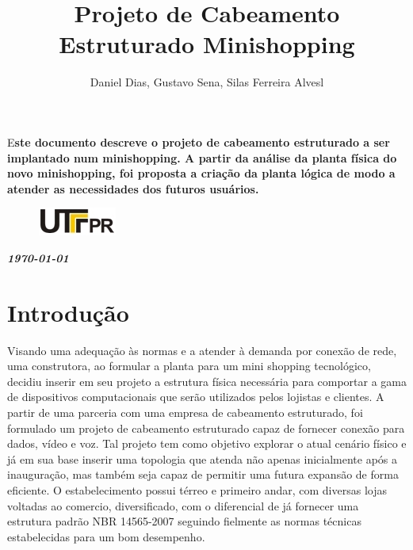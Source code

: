 \documentclass[	DIV=calc,%
							paper=a4,%
							fontsize=12pt,%
							onecolumn]{scrartcl}	 					%
\title{Projeto de Cabeamento Estruturado Minishopping}					%
\author{Daniel Dias, Gustavo Sena, Silas Ferreira Alvesl }  	%
\date{}																				%
\newcommand{\initial}[1]{%
     \lettrine[lines=3,lhang=0.3,nindent=0em]{
     				\color{DarkGoldenrod}
     				{\textsf{#1}}}{}}
\begin{document}
\maketitle
\thispagestyle{fancy} 	
\thispagestyle{empty}		%




\initial{E}\textbf{ste documento descreve o projeto de cabeamento estruturado a ser implantado num minishopping. 
A partir da análise da planta física do novo minishopping, foi proposta  a criação da planta lógica de modo a atender as necessidades dos futuros usuários.}
\begin{figure}
	\centering
	\includegraphics{utfpr}
\end{figure}

\vspace{3cm}
\centerline{\textit{\textbf{\today}}}

\clearpage
    \renewcommand*\listfigurename{Lista de figuras}
\listoffigures





\clearpage
\renewcommand{\contentsname}{Sumário}
\tableofcontents
\clearpage

\section{Introdução}
Visando uma adequação às normas e a atender à demanda por conexão de rede, uma construtora, ao formular a planta para um  mini shopping tecnológico, decidiu inserir em seu projeto a estrutura física necessária para comportar a gama de dispositivos computacionais que serão utilizados pelos lojistas e clientes.
A partir de uma parceria com uma empresa de cabeamento estruturado, foi formulado um projeto de cabeamento estruturado capaz de fornecer conexão para dados, vídeo e voz.
Tal projeto tem como objetivo explorar o atual cenário físico e já em sua base inserir uma topologia que atenda não apenas inicialmente após a inauguração, mas também seja capaz de permitir uma futura expansão de forma eficiente.
O estabelecimento possui térreo e primeiro andar, com diversas lojas voltadas ao comercio, diversificado, com o diferencial de já fornecer uma estrutura padrão NBR 14565-2007 seguindo fielmente as normas técnicas estabelecidas para um bom desempenho.
\end{document}
